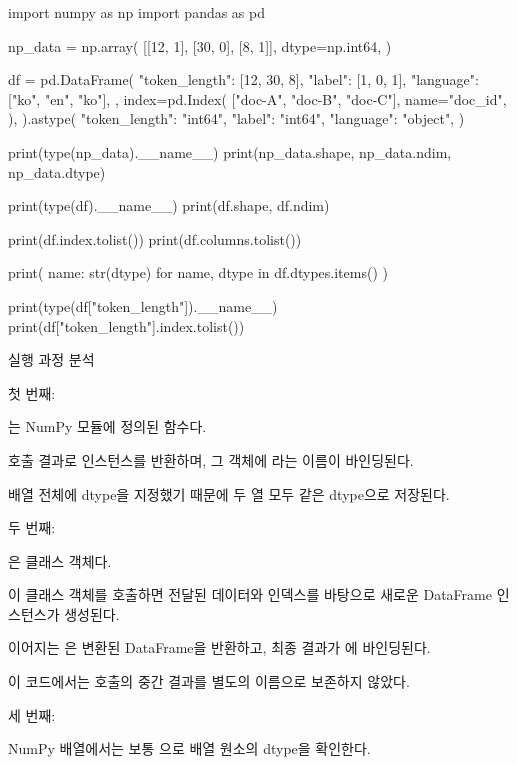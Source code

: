 \begin{dhkcode}
import numpy as np
import pandas as pd

np_data = np.array(
    [[12, 1], [30, 0], [8, 1]],
    dtype=np.int64,
)

df = pd.DataFrame(
    {
        "token_length": [12, 30, 8],
        "label": [1, 0, 1],
        "language": ["ko", "en", "ko"],
    },
    index=pd.Index(
        ["doc-A", "doc-B", "doc-C"],
        name="doc_id",
    ),
).astype({
    "token_length": "int64",
    "label": "int64",
    "language": "object",
})

print(type(np_data).__name__)
print(np_data.shape, np_data.ndim, np_data.dtype)

print(type(df).__name__)
print(df.shape, df.ndim)

print(df.index.tolist())
print(df.columns.tolist())

print({
    name: str(dtype)
    for name, dtype in df.dtypes.items()
})

print(type(df["token_length"]).__name__)
print(df["token_length"].index.tolist())
\end{dhkcode}

\begin{dhknote}
\begin{dhksmry}[centered]
실행 과정 분석
\end{dhksmry}
\end{dhknote}

첫 번째: 

는 NumPy 모듈에 정의된 함수다.

호출 결과로  인스턴스를 반환하며, 그 객체에 라는 이름이 바인딩된다.

배열 전체에  dtype을 지정했기 때문에 두 열 모두 같은 dtype으로 저장된다.

두 번째: 

은 클래스 객체다.

이 클래스 객체를 호출하면 전달된 데이터와 인덱스를 바탕으로 새로운 DataFrame 인스턴스가 생성된다.

이어지는 은 변환된 DataFrame을 반환하고, 최종 결과가 에 바인딩된다.

이 코드에서는  호출의 중간 결과를 별도의 이름으로 보존하지 않았다.

세 번째: 

NumPy 배열에서는 보통 으로 배열 원소의 dtype을 확인한다.

